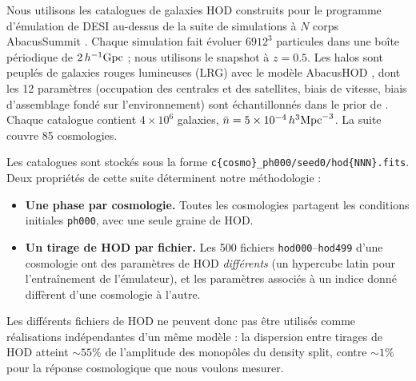 \documentclass[11pt,twocolumn]{article}
\begin{document}
Nous utilisons les catalogues de galaxies HOD construits pour le programme d'émulation de DESI au-dessus de la suite de simulations à $N$ corps AbacusSummit \cite{Maksimova2021}. Chaque simulation fait évoluer $6912^3$ particules dans une boîte périodique de $2\,h^{-1}{\rm Gpc}$ ; nous utilisons le snapshot à $z=0.5$. Les halos sont peuplés de galaxies rouges lumineuses (LRG) avec le modèle AbacusHOD \cite{Yuan2022}, dont les 12 paramètres (occupation des centrales et des satellites, biais de vitesse, biais d'assemblage fondé sur l'environnement) sont échantillonnés dans le prior de \cite{Yuan2023}. Chaque catalogue contient $4\times10^6$ galaxies, $\bar n = 5\times10^{-4}\,h^3{\rm Mpc}^{-3}$. La suite couvre 85 cosmologies.

Les catalogues sont stockés sous la forme \texttt{c\{cosmo\}\_ph000/seed0/hod\{NNN\}.fits}. Deux propriétés de cette suite déterminent notre méthodologie :
\begin{itemize}
\item \textbf{Une phase par cosmologie.} Toutes les cosmologies partagent les conditions initiales \texttt{ph000}, avec une seule graine de HOD.
\item \textbf{Un tirage de HOD par fichier.} Les 500 fichiers \texttt{hod000}--\texttt{hod499} d'une cosmologie ont des paramètres de HOD \emph{différents} (un hypercube latin pour l'entraînement de l'émulateur), et les paramètres associés à un indice donné diffèrent d'une cosmologie à l'autre.
\end{itemize}
Les différents fichiers de HOD ne peuvent donc pas être utilisés comme réalisations indépendantes d'un même modèle : la dispersion entre tirages de HOD atteint $\sim55\%$ de l'amplitude des monopôles du density split, contre $\sim1\%$ pour la réponse cosmologique que nous voulons mesurer.
\end{document}

